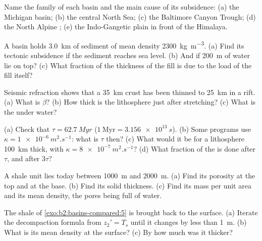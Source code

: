 \begin{exercise}[$\star$]\label{exo:b2:basins-compared:1}
Name the family of each basin and the main cause of its subsidence: (a) the Michigan basin;
(b) the central North Sea; (c) the Baltimore Canyon Trough; (d) the North Alpine ;
(e) the Indo-Gangetic plain in front of the Himalaya.
\end{exercise}

\begin{exercise}[$\star$]\label{exo:b2:basins-compared:2}
A basin holds \qty{3.0}{km} of sediment of mean density \qty{2300}{kg.m^{-3}}. (a) Find its
tectonic subsidence if the sediment reaches sea level. (b) And if \qty{200}{m} of water lie on
top? (c) What fraction of the thickness of the fill is due to the load of the fill itself?
\end{exercise}

\begin{exercise}[$\star$]\label{exo:b2:basins-compared:3}
Seismic refraction shows that a \qty{35}{km} crust has been thinned to \qty{25}{km} in a rift.
(a) What is $\beta$? (b) How thick is the lithosphere just after stretching? (c) What is the
 under water?
\end{exercise}

\begin{exercise}[$\star$]\label{exo:b2:basins-compared:4}
(a) Check that $\tau = \qty{62.7}{Myr}$ ($1~\text{Myr} = \qty{3.156e13}{s}$). (b) Some programs
use $\kappa = \qty{1e-6}{m^2.s^{-1}}$: what is $\tau$ then? (c) What would it be for a
lithosphere \qty{100}{km} thick, with $\kappa = \qty{8e-7}{m^2.s^{-1}}$? (d) What fraction of
the  is done after $\tau$, and after $3\tau$?
\end{exercise}

\begin{exercise}[$\star\star$]\label{exo:b2:basins-compared:5}
A shale unit lies today between \qty{1000}{m} and \qty{2000}{m}. (a) Find its porosity at the
top and at the base. (b) Find its solid thickness. (c) Find its mass per unit area and its mean
density, the pores being full of water.
\end{exercise}

\begin{exercise}[$\star\star$]\label{exo:b2:basins-compared:6}
The shale of \cref{exo:b2:basins-compared:5} is brought back to the surface. (a) Iterate the
decompaction formula from $z_2' = T_s$ until it changes by less than \qty{1}{m}. (b) What is
its mean density at the surface? (c) By how much was it thicker?
\end{exercise}

